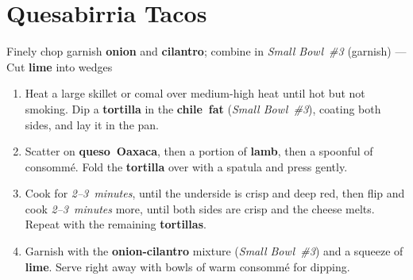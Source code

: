 \documentclass[11pt,letterpaper]{article}
\begin{document}
\filbreak
\section*{Quesabirria Tacos}

\noindent
Finely chop garnish \textbf{onion} and \textbf{cilantro}; combine in \textit{Small Bowl~\#3} (garnish) ---
Cut \textbf{lime} into wedges

\begin{enumerate}
    \item Heat a large skillet or comal over medium-high heat until hot but not smoking. Dip a \textbf{tortilla} in the \textbf{chile~fat} (\textit{Small Bowl~\#3}), coating both sides, and lay it in the pan.
    \item Scatter on \textbf{queso~Oaxaca}, then a portion of \textbf{lamb}, then a spoonful of consommé. Fold the \textbf{tortilla} over with a spatula and press gently.
    \item Cook for \textit{2--3~minutes}, until the underside is crisp and deep red, then flip and cook \textit{2--3~minutes} more, until both sides are crisp and the cheese melts. Repeat with the remaining \textbf{tortillas}.
    \item Garnish with the \textbf{onion-cilantro} mixture (\textit{Small Bowl~\#3}) and a squeeze of \textbf{lime}. Serve right away with bowls of warm consommé for dipping.
\end{enumerate}

\filbreak

\newpage
\end{document}
